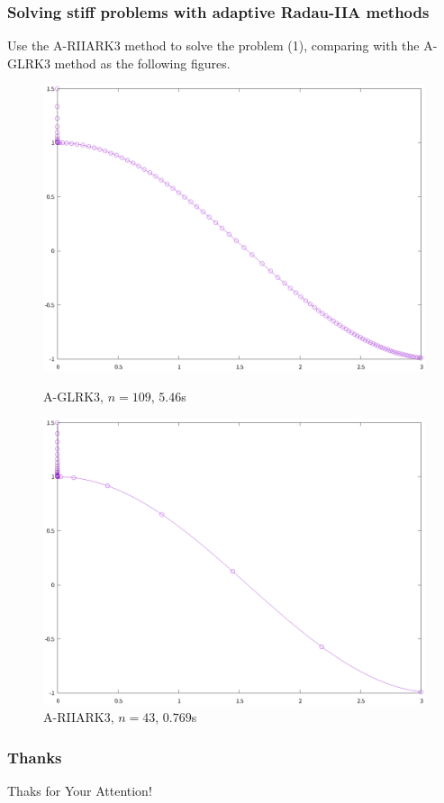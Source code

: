 \documentclass[9pt]{beamer}
\begin{document}
\begin{frame}
  \frametitle{Solving stiff problems with adaptive Radau-IIA methods}

Use the A-RIIARK$3$ method to solve the problem (1), comparing with the A-GLRK$3$ method as the following figures.

\begin{figure}[H]
  \centering
  \begin{minipage}[t]{0.4\linewidth}
      \centering
      \includegraphics[width=0.9\linewidth]{pic/10-2.eps}
      \caption{\small A-GLRK$3$, $n=109$, $5.46$s}
  \end{minipage}
  \hspace{2em}
  \begin{minipage}[t]{0.4\linewidth}
      \centering
      \includegraphics[width=0.9\linewidth]{pic/10-3.eps}
      \caption{\small A-RIIARK$3$, $n=43$, $0.769$s}
  \end{minipage}
\end{figure}

\end{frame}

\begin{frame}
    \frametitle{Thanks}
    \centering
    \Large Thaks for Your Attention!
\end{frame}
\end{document}
